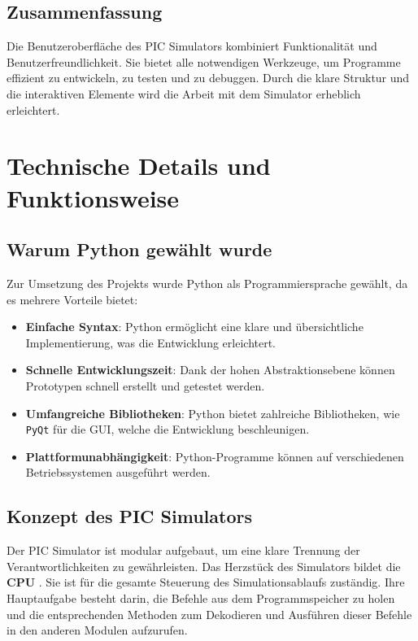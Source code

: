\section{Zusammenfassung}
Die Benutzeroberfläche des PIC Simulators kombiniert Funktionalität und Benutzerfreundlichkeit. Sie bietet alle notwendigen Werkzeuge, um Programme effizient zu entwickeln, zu testen und zu debuggen. Durch die klare Struktur und die interaktiven Elemente wird die Arbeit mit dem Simulator erheblich erleichtert.






\chapter{Technische Details und Funktionsweise}

\section{Warum Python gewählt wurde}
Zur Umsetzung des Projekts wurde Python als Programmiersprache gewählt, da es mehrere Vorteile bietet:
\begin{itemize}
    \item \textbf{Einfache Syntax}: Python ermöglicht eine klare und übersichtliche Implementierung, was die Entwicklung erleichtert.
    \item \textbf{Schnelle Entwicklungszeit}: Dank der hohen Abstraktionsebene können Prototypen schnell erstellt und getestet werden.
    \item \textbf{Umfangreiche Bibliotheken}: Python bietet zahlreiche Bibliotheken, wie \texttt{PyQt} für die \ac{GUI}, welche die Entwicklung beschleunigen.
    \item \textbf{Plattformunabhängigkeit}: Python-Programme können auf verschiedenen Betriebssystemen ausgeführt werden.
\end{itemize}


\section{Konzept des PIC Simulators}
Der PIC Simulator ist modular aufgebaut, um eine klare Trennung der Verantwortlichkeiten zu gewährleisten. Das Herzstück des Simulators bildet die \textbf{\ac{CPU}} . Sie ist für die gesamte Steuerung des Simulationsablaufs zuständig. Ihre Hauptaufgabe besteht darin, die Befehle aus dem Programmspeicher zu holen und die entsprechenden Methoden zum Dekodieren und Ausführen dieser Befehle in den anderen Modulen aufzurufen.

